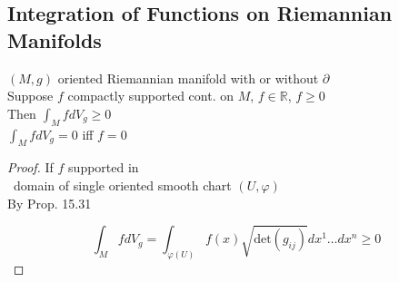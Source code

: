 %                                               
%                                                              
%


\subsection*{Integration of Functions on Riemannian Manifolds}

\begin{proposition}[16.28]
  $(M,g)$ oriented Riemannian manifold with or without $\partial$ \\
Suppose $f$ compactly supported cont. on $M$, $f\in \mathbb{R}$, $f\geq 0$ \\
Then $\int_M f dV_g \geq 0$ \\
\phantom{Then } $\int_M f dV_g = 0$ iff $f=0$
\end{proposition}

\begin{proof}
  If $f$ supported in \\
\quad \, domain of single oriented smooth chart $(U,\varphi)$  \\

By Prop. 15.31


\[
\int_M f dV_g = \int_{ \varphi{(U)}} f(x) \sqrt{ \text{det}{ (g_{ij} ) } } dx^1 \dots dx^n \geq 0
\]




\end{proof}

